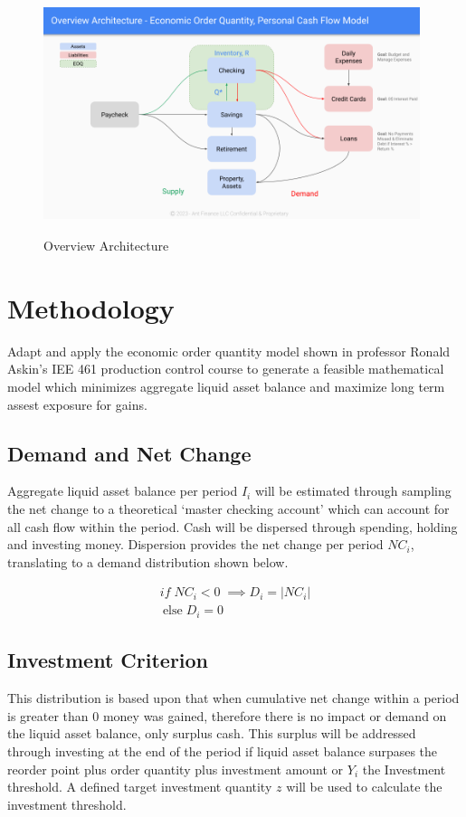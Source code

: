 \documentclass{article}
\begin{document}
\begin{figure}
	\centering
	\includegraphics[width=11cm, height=7cm]{EOQ Personal Cash Flow Model}
	\caption{Overview Architecture}
	\label{fig:fig1}
\end{figure}
\FloatBarrier

\section{Methodology}
Adapt and apply the economic order quantity model shown in professor Ronald Askin’s IEE 461 \cite{Askin2019} production control course to generate a feasible mathematical model which minimizes aggregate liquid asset balance and maximize long term assest exposure for gains. 

\subsection{Demand and Net Change}
Aggregate liquid asset balance per period  $I_{i}$ will be estimated through sampling the net change to a theoretical ‘master checking account’ which can account for all cash flow within the period. Cash will be dispersed through spending, holding and investing money. Dispersion provides the net change per period $NC_{i}$, translating to a demand distribution shown below.

\begin{equation}
	\begin{split}
		if \; NC_{i} < 0 \;\implies D_{i} = |NC_{i}| \\
	  	\:\text{else}\; D_{i} = 0
	\end{split}
\end{equation}
 
\subsection{Investment Criterion}
This distribution is based upon that when cumulative net change within a period is greater than 0 money was gained, therefore there is no impact or demand on the liquid asset balance, only surplus cash. This surplus will be addressed through investing at the end of the period if liquid asset balance surpases the reorder point plus order quantity plus investment amount or $Y_{i}$ the Investment threshold. A defined target investment quantity $z$ will be used to calculate the investment threshold. 
\end{document}
